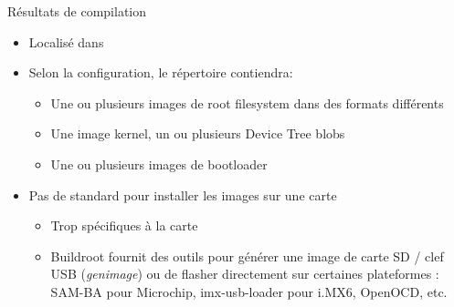 \begin{frame}{Résultats de compilation}
  \begin{itemize}
  \item Localisé dans 
  \item Selon la configuration, le répertoire contiendra:
    \begin{itemize}
    \item Une ou plusieurs images de root filesystem dans des formats différents
    \item Une image kernel, un ou plusieurs Device Tree blobs
    \item Une ou plusieurs images de bootloader
    \end{itemize}
  \item Pas de standard pour installer les images sur une carte
    \begin{itemize}
    \item Trop spécifiques à la carte
    \item Buildroot fournit des outils pour générer une image de carte SD / clef USB
      ({\em genimage}) ou de flasher directement sur certaines plateformes :
      SAM-BA pour Microchip, imx-usb-loader pour i.MX6, OpenOCD, etc.
    \end{itemize}
  \end{itemize}
\end{frame}
